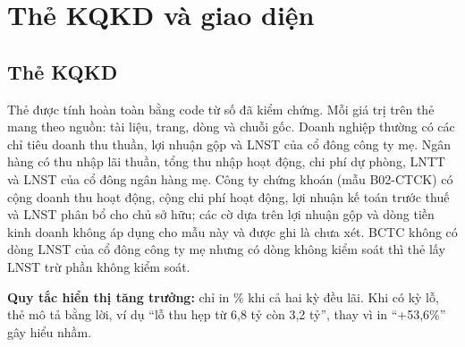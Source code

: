\documentclass[12pt,a4paper]{report}
\newcommand{\enquote}[1]{“#1”}
\begin{document}
\section{Thẻ KQKD và giao diện}
\subsection{Thẻ KQKD}
Thẻ được tính hoàn toàn bằng code từ số đã kiểm chứng. Mỗi giá trị trên thẻ mang theo nguồn: tài liệu, trang, dòng và
chuỗi gốc. Doanh nghiệp thường có các chỉ tiêu doanh thu thuần, lợi nhuận gộp và LNST của cổ đông công ty mẹ. Ngân hàng
có thu nhập lãi thuần, tổng thu nhập hoạt động, chi phí dự phòng, LNTT và LNST của cổ đông ngân hàng mẹ. Công ty chứng
khoán (mẫu B02-CTCK) có cộng doanh thu hoạt động, cộng chi phí hoạt động, lợi nhuận kế toán trước thuế và LNST phân bổ
cho chủ sở hữu; các cờ dựa trên lợi nhuận gộp và dòng tiền kinh doanh không áp dụng cho mẫu này và được ghi là chưa xét.
BCTC không có dòng LNST của cổ đông công ty mẹ nhưng có dòng không kiểm soát thì thẻ lấy LNST trừ phần không kiểm soát.

\textbf{Quy tắc hiển thị tăng trưởng:} chỉ in \% khi cả hai kỳ đều lãi. Khi có kỳ lỗ, thẻ mô tả bằng lời, ví dụ
\enquote{lỗ thu hẹp từ 6,8 tỷ còn 3,2 tỷ}, thay vì in \enquote{+53,6\%} gây hiểu nhầm.
\end{document}

